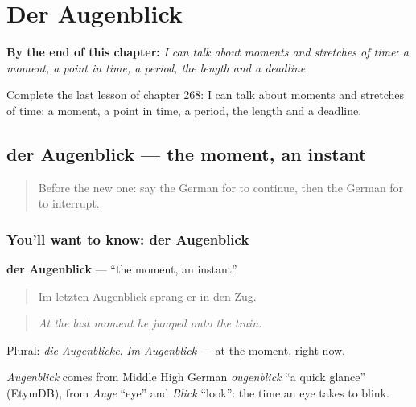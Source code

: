 
\chapter{Der Augenblick}
\label{ch:ge-der-augenblick}

\begin{chapteropening}
\textbf{By the end of this chapter:} \emph{I can talk about moments and stretches of time: a moment, a point in time, a period, the length and a deadline.}

Complete the last lesson of chapter 268: I can talk about moments and stretches of time: a moment, a point in time, a period, the length and a deadline.
\end{chapteropening}

\section[der Augenblick]{der Augenblick — the moment, an instant}

\label{lesson:GE-C268-augenblick}



\begin{quote}
Before the new one: say the German for to continue, then the German for to interrupt.
\end{quote}

\subsection*{You'll want to know: der Augenblick}
\textbf{der Augenblick} — \textquotedblleft{}the moment, an instant\textquotedblright{}.

\begin{quote}
Im letzten Augenblick sprang er in den Zug.
\end{quote}

\begin{quote}
\emph{At the last moment he jumped onto the train.}
\end{quote}

Plural: \emph{die Augenblicke}. \emph{Im Augenblick} — at the moment, right now.

\begin{cousinweb}
\emph{Augenblick} comes from Middle High German \emph{ougenblick} \textquotedblleft{}a quick glance\textquotedblright{} (EtymDB), from \emph{Auge} \textquotedblleft{}eye\textquotedblright{} and \emph{Blick} \textquotedblleft{}look\textquotedblright{}: the time an eye takes to blink.
\end{cousinweb}

